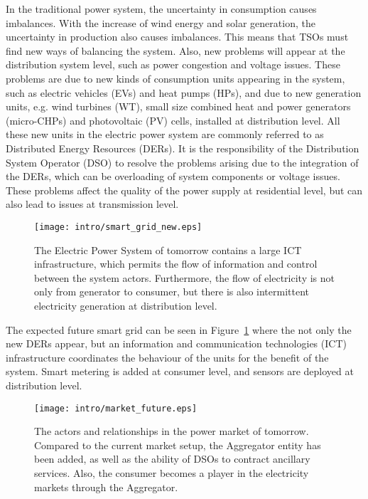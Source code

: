 In the traditional power system, the uncertainty in consumption causes imbalances. With the increase of wind energy and solar generation, the uncertainty in production also causes imbalances. This means that TSOs must find new ways of balancing the system. Also, new problems will appear at the distribution system level, such as power congestion and voltage issues. These problems are due to new kinds of consumption units appearing in the system, such as electric vehicles (EVs) and heat pumps (HPs), and due to new generation units, e.g. wind turbines (WT), small size combined heat and power generators (micro-CHPs) and photovoltaic (PV) cells, installed at distribution level. All these new units in the electric power system are commonly referred to as Distributed Energy Resources (DERs). It is the responsibility of the Distribution System Operator (DSO) to resolve the problems arising due to the integration of the DERs, which can be overloading of system components or voltage issues. These problems affect the quality of the power supply at residential level, but can also lead to issues at transmission level.
\begin{figure}[ht]
	\centering
	\caption{The Electric Power System of tomorrow contains a large ICT infrastructure, which permits the flow of information and control between the system actors. Furthermore, the flow of electricity is not only from generator to consumer, but there is also intermittent electricity generation at distribution level.}
	\texttt{[image: intro/smart\_grid\_new.eps]}\label{fig:powerfuture}
\end{figure}

The expected future smart grid can be seen in Figure~\ref{fig:powerfuture} where the not only the new DERs appear, but an information and communication technologies (ICT) infrastructure coordinates the behaviour of the units for the benefit of the system. Smart metering is added at consumer level, and sensors are deployed at distribution level.
\begin{figure*}
	\centering
	\caption{The actors and relationships in the power market of tomorrow. Compared to the current market setup, the Aggregator entity has been added, as well as the ability of DSOs to contract ancillary services. Also, the consumer becomes a player in the electricity markets through the Aggregator.}
	\texttt{[image: intro/market\_future.eps]}\label{fig:marketfuture}
\end{figure*}


